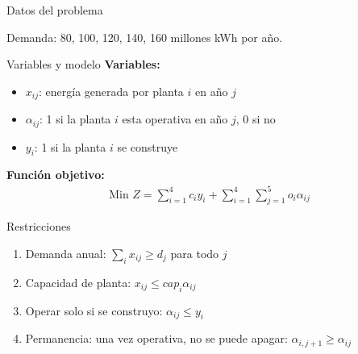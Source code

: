 \documentclass{beamer}
\begin{document}
\begin{frame}{Datos del problema}
    \begin{table}[H]
    \end{table}
    Demanda: 80, 100, 120, 140, 160 millones kWh por año.
\end{frame}

\begin{frame}{Variables y modelo}
    \textbf{Variables:}
    \begin{itemize}
        \item $x_{ij}$: energía generada por planta $i$ en año $j$
        \item $\alpha_{ij}$: 1 si la planta $i$ esta operativa en año $j$, 0 si no
        \item $y_i$: 1 si la planta $i$ se construye
    \end{itemize}
    \vspace{0.5em}
    \textbf{Función objetivo:}
    \begin{align*}
        \text{Min } Z = \sum_{i=1}^{4} c_i y_i + \sum_{i=1}^{4}\sum_{j=1}^{5} o_i \alpha_{ij}
    \end{align*}
\end{frame}

\begin{frame}{Restricciones}
    \begin{enumerate}
        \item Demanda anual: $\sum_{i} x_{ij} \geq d_j$ para todo $j$
        \item Capacidad de planta: $x_{ij} \leq cap_i \alpha_{ij}$
        \item Operar solo si se construyo: $\alpha_{ij} \leq y_i$
        \item Permanencia: una vez operativa, no se puede apagar: $\alpha_{i,j+1} \geq \alpha_{ij}$
    \end{enumerate}
\end{frame}
\end{document}
